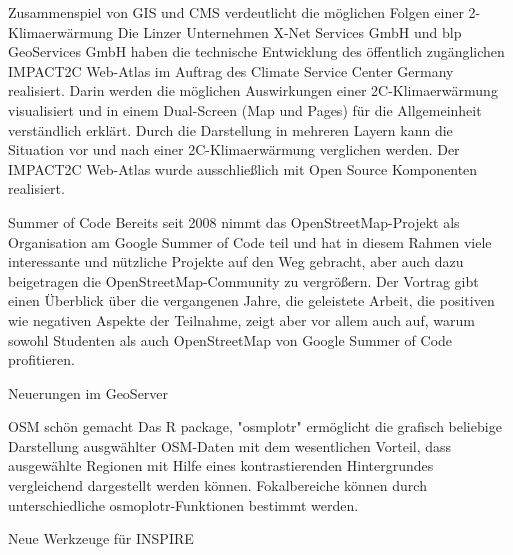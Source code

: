 \renewcommand{\konferenztag}{\mittwoch}
%
{Zusammenspiel von GIS und CMS verdeutlicht die möglichen Folgen einer 2\textdegree-Klimaerwärmung}%
{}%
{Die Linzer Unternehmen X-Net Services GmbH und blp GeoServices GmbH haben die technische Entwicklung
des öffentlich zugänglichen IMPACT2C Web-Atlas im Auftrag des Climate Service Center Germany realisiert.
Darin werden die möglichen Auswirkungen einer 2\textdegree C-Klimaerwärmung visualisiert und in einem Dual-Screen
(Map und Pages) für die Allgemeinheit verständlich erklärt. Durch die Darstellung in mehreren Layern
kann die Situation vor und nach einer 2\textdegree C-Klimaerwärmung verglichen werden.
Der IMPACT2C Web-Atlas wurde ausschließlich mit Open Source Komponenten realisiert.}

%
{Summer of Code}%
{}%
{Bereits seit 2008 nimmt das OpenStreetMap-Projekt als Organisation am Google Summer of Code teil und
hat in diesem Rahmen viele interessante und nützliche Projekte auf den Weg gebracht, aber auch dazu
beigetragen die OpenStreetMap-Community zu vergrößern. Der Vortrag gibt einen Überblick über die
vergangenen Jahre, die geleistete Arbeit, die positiven wie negativen Aspekte der Teilnahme, zeigt
aber vor allem auch auf, warum sowohl Studenten als auch OpenStreetMap von Google Summer of Code profitieren.}

%
{Neuerungen im GeoServer}%
{}%
{}

%
{OSM schön gemacht}%
{}%
{Das R package, "osmplotr" ermöglicht  die grafisch beliebige Darstellung ausgwählter OSM-Daten mit dem
wesentlichen Vorteil, dass ausgewählte Regionen mit Hilfe eines kontrastierenden Hintergrundes vergleichend
dargestellt werden können. Fokalbereiche können durch unterschiedliche osmoplotr-Funktionen bestimmt werden.}

%
{Neue Werkzeuge für INSPIRE}%
{}%
{}

